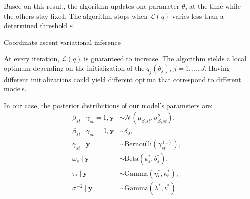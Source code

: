 \documentclass{article}
\numberwithin{equation}{section}
\begin{document}
Based on this result, the algorithm updates one parameter $\theta_j$ at the time while the others stay fixed. The algorithm stops when $\mathcal{L}(q)$ varies less than a determined threshold $\varepsilon$.

\begin{algorithm}
\BlankLine
{}
\BlankLine
{}
\BlankLine
{}
\caption{Coordinate ascent variational inference \label{algo:CAVI}}
\end{algorithm}
At every iteration, $\mathcal{L}(q)$ is guaranteed to increase. The algorithm yields a local optimum depending on the initialization of the $q_j(\theta_j)$, $j=1,\ldots,J$. Having different initializations could yield different optima that correspond to different models.

In our case, the posterior distributions of our model's parameters are:
\begin{align*}
\beta_{st} \mid \gamma_{st} = 1, \boldsymbol{y} &\sim \mathcal{N}\left(\mu_{\beta, st},\sigma^2_{\beta, st}\right),\\
\beta_{st} \mid \gamma_{st} = 0, \boldsymbol{y} &\sim \delta_0,\\
\gamma_{st} \mid \boldsymbol{y} &\sim \text{Bernoulli}(\gamma_{st}^{(1)}),\\
\omega_s\mid\boldsymbol{y} &\sim \text{Beta}(a_s^*,b_s^*),\\
\tau_t\mid \boldsymbol{y} &\sim \text{Gamma}(\eta^*_t, \kappa^*_t),\\
\sigma^{-2} \mid \boldsymbol{y} &\sim \text{Gamma}(\lambda^*, \nu^*).
\end{align*}

\newpage
\end{document}
